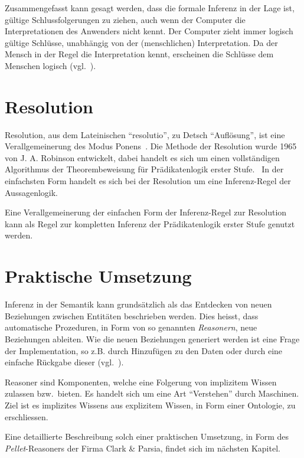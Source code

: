 Zusammengefasst kann gesagt werden, dass die formale Inferenz in der Lage ist, gültige Schlussfolgerungen zu ziehen, auch wenn der Computer die Interpretationen des Anwenders nicht kennt. Der Computer zieht immer logisch gültige Schlüsse, unabhängig von der (menschlichen) Interpretation. Da der Mensch in der Regel die Interpretation kennt, erscheinen die Schlüsse dem Menschen logisch (vgl.~\cite[S. 165]{russel}).

\section{Resolution}
\label{sec:resolution}

Resolution, aus dem Lateinischen ``resolutio'', zu Detsch ``Auflösung'', ist eine Verallgemeinerung des Modus Ponens~\cite[S. 279]{russel}. Die Methode der Resolution wurde 1965 von J. A. Robinson entwickelt, dabei handelt es sich um einen vollständigen Algorithmus der Theorembeweisung für Prädikatenlogik erster Stufe.~\cite[S. 18]{russel} In der einfachsten Form handelt es sich bei der Resolution um eine Inferenz-Regel der Aussagenlogik.~\cite[S. 277]{russel}

Eine Verallgemeinerung der einfachen Form der Inferenz-Regel zur Resolution kann als Regel zur kompletten Inferenz der Prädikatenlogik erster Stufe genutzt werden.~\cite[S. 278]{russel}

\section{Praktische Umsetzung}
\label{sec:inferenz_praktisch}

Inferenz in der Semantik kann grundsätzlich als das Entdecken von neuen Beziehungen zwischen Entitäten beschrieben werden. Dies heisst, dass automatische Prozeduren, in Form von so genannten \textit{Reasonern}, neue Beziehungen ableiten. Wie die neuen Beziehungen generiert werden ist eine Frage der Implementation, so z.B. durch Hinzufügen zu den Daten oder durch eine einfache Rückgabe dieser (vgl.~\cite[Abschnitt 1]{w3inference}).

Reasoner sind Komponenten, welche eine Folgerung von implizitem Wissen zulassen bzw.\ bieten. Es handelt sich um eine Art ``Verstehen'' durch Maschinen. Ziel ist es implizites Wissens aus explizitem Wissen, in Form einer Ontologie, zu erschliessen.

Eine detaillierte Beschreibung solch einer praktischen Umsetzung, in Form des \textit{Pellet}-Reasoners der Firma Clark \& Parsia, findet sich im nächsten Kapitel.

